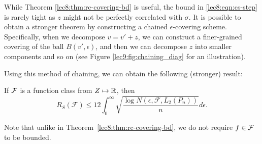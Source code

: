 While Theorem \ref{lec8:thm:rc-covering-bd} is useful, the bound in \eqref{lec8:eqn:cs-step} is rarely tight as $z$ might not be perfectly correlated with $\sigma$. It is possible to obtain a stronger theorem by constructing a chained $\epsilon$-covering scheme. Specifically, when we decompose $v=v'+z$, we can construct a finer-grained covering of the ball $B(v',\epsilon)$, and then we can decompose $z$ into smaller components and so on (see Figure \ref{lec9:fig:chaining_diag} for an illustration).

Using this method of chaining, we can obtain the following (stronger) result:

\begin{theorem}
If $\mathcal F$ is a function class from $Z \mapsto \mathbb R$, then
\begin{equation}
    R_S(\mathcal{F})\leq 12\int_{0}^{\infty}\sqrt{\frac{\log N(\epsilon, \mathcal{F}, L_2(P_n))}{n}}d\epsilon. \label{lec9:eqn:dudley}
\end{equation}
\end{theorem}

Note that unlike in Theorem~\ref{lec8:thm:rc-covering-bd}, we do not require $f \in \mathcal F$ to be bounded.

